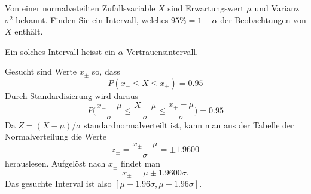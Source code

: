Von einer normalveteilten Zufallsvariable $X$ sind Erwartungswert $\mu$
und Varianz $\sigma^2$ bekannt. Finden Sie ein Intervall, welches
$95\%=1-\alpha$ der Beobachtungen von $X$ enthält.

Ein solches Intervall heisst ein $\alpha$-Vertrauensintervall.

\begin{loesung}
Gesucht sind Werte $x_\pm$ so, dass 
\[
P(x_-\le X\le x_+)=0.95
\]
Durch Standardisierung wird daraus
\[
P\biggl(\frac{x_--\mu}{\sigma}\le \frac{X-\mu}{\sigma} \le \frac{x_+-\mu}{\sigma}\biggr)
=0.95
\]
Da $Z=(X-\mu)/\sigma$ standardnormalverteilt ist, kann man aus der
Tabelle der Normalverteilung die Werte
\[
z_\pm=\frac{x_\pm -\mu}{\sigma}=\pm1.9600
\]
herauslesen. Aufgelöst nach $x_\pm$ findet man
\[
x_\pm = \mu\pm1.9600\sigma.
\]
Das gesuchte Interval ist also $[\mu-1.96\sigma,\mu+1.96\sigma]$.
\end{loesung}

